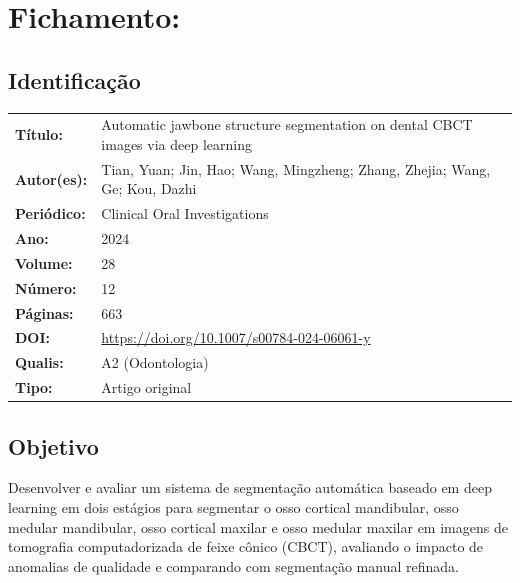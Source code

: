 \section{Fichamento: }

\subsection{Identificação}
\begin{tabular}{ll}
\textbf{Título:} & Automatic jawbone structure segmentation on dental CBCT
images via deep learning \\
\textbf{Autor(es):} & Tian, Yuan; Jin, Hao; Wang, Mingzheng; Zhang, Zhejia;
Wang, Ge; Kou, Dazhi \\
\textbf{Periódico:} & Clinical Oral Investigations \\
\textbf{Ano:} & 2024 \\
\textbf{Volume:} & 28 \\
\textbf{Número:} & 12 \\
\textbf{Páginas:} & 663 \\
\textbf{DOI:} & \url{https://doi.org/10.1007/s00784-024-06061-y} \\
\textbf{Qualis:} & A2 (Odontologia) \\
\textbf{Tipo:} & Artigo original \\
\end{tabular}

\subsection{Objetivo}
Desenvolver e avaliar um sistema de segmentação automática baseado em deep
learning em dois estágios para segmentar o osso cortical mandibular, osso
medular mandibular, osso cortical maxilar e osso medular maxilar em imagens
de tomografia computadorizada de feixe cônico (CBCT), avaliando o impacto de
anomalias de qualidade e comparando com segmentação manual refinada.

